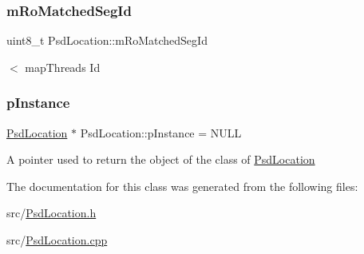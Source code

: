 \subsubsection{\texorpdfstring{m\+Ro\+Matched\+Seg\+Id}{mRoMatchedSegId}}
{\footnotesize\ttfamily uint8\+\_\+t Psd\+Location\+::m\+Ro\+Matched\+Seg\+Id}

$<$ map\+Thread\textquotesingle{}s Id \mbox{\label{class_psd_location_a65504484bcffebd2f8a95cf7d5b26f2d}} 
\subsubsection{\texorpdfstring{p\+Instance}{pInstance}}
{\footnotesize\ttfamily \hyperlink{class_psd_location}{Psd\+Location} $\ast$ Psd\+Location\+::p\+Instance = N\+U\+LL\hspace{0.3cm}{\ttfamily [static]}}

A pointer used to return the object of the class of \hyperlink{class_psd_location}{Psd\+Location} 

The documentation for this class was generated from the following files\+:\begin{DoxyCompactItemize}
\item 
src/\hyperlink{_psd_location_8h}{Psd\+Location.\+h}\item 
src/\hyperlink{_psd_location_8cpp}{Psd\+Location.\+cpp}\end{DoxyCompactItemize}
